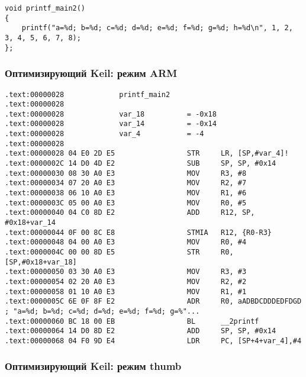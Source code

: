 \begin{lstlisting}
void printf_main2()
{
	printf("a=%d; b=%d; c=%d; d=%d; e=%d; f=%d; g=%d; h=%d\n", 1, 2, 3, 4, 5, 6, 7, 8);
};
\end{lstlisting}

\subsubsection{Оптимизирующий Keil: режим ARM}

\begin{lstlisting}
.text:00000028             printf_main2
.text:00000028
.text:00000028             var_18          = -0x18
.text:00000028             var_14          = -0x14
.text:00000028             var_4           = -4
.text:00000028
.text:00000028 04 E0 2D E5                 STR     LR, [SP,#var_4]!
.text:0000002C 14 D0 4D E2                 SUB     SP, SP, #0x14
.text:00000030 08 30 A0 E3                 MOV     R3, #8
.text:00000034 07 20 A0 E3                 MOV     R2, #7
.text:00000038 06 10 A0 E3                 MOV     R1, #6
.text:0000003C 05 00 A0 E3                 MOV     R0, #5
.text:00000040 04 C0 8D E2                 ADD     R12, SP, #0x18+var_14
.text:00000044 0F 00 8C E8                 STMIA   R12, {R0-R3}
.text:00000048 04 00 A0 E3                 MOV     R0, #4
.text:0000004C 00 00 8D E5                 STR     R0, [SP,#0x18+var_18]
.text:00000050 03 30 A0 E3                 MOV     R3, #3
.text:00000054 02 20 A0 E3                 MOV     R2, #2
.text:00000058 01 10 A0 E3                 MOV     R1, #1
.text:0000005C 6E 0F 8F E2                 ADR     R0, aADBDCDDDEDFDGD ; "a=%d; b=%d; c=%d; d=%d; e=%d; f=%d; g=%"...
.text:00000060 BC 18 00 EB                 BL      __2printf
.text:00000064 14 D0 8D E2                 ADD     SP, SP, #0x14
.text:00000068 04 F0 9D E4                 LDR     PC, [SP+4+var_4],#4
\end{lstlisting}

\subsubsection{Оптимизирующий Keil: режим thumb}

